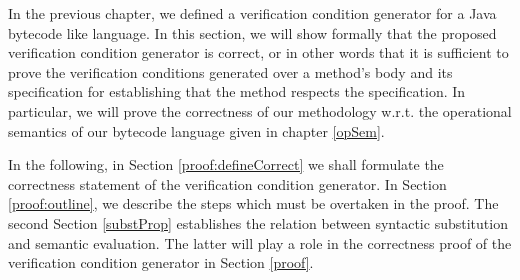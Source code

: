  In the previous chapter, we defined a verification
 condition generator for a Java bytecode like language. In this section, we will show formally that the
 proposed verification condition generator is correct, or in other words that it is sufficient
 to prove the verification conditions generated over a method's body and its specification 
 for establishing that the method respects the specification. 
 In particular, we will prove the correctness of our methodology w.r.t. the operational semantics of our bytecode language
 given in chapter \ref{opSem}.  
 
 

 In the following, in Section \ref{proof:defineCorrect} we shall formulate the correctness statement of the verification 
 condition generator. In Section \ref{proof:outline}, we describe the steps which must be overtaken in the proof. 
 The second Section \ref{substProp} establishes the relation between syntactic substitution  and semantic evaluation.
 The latter will play a role in the correctness proof  of the verification condition generator
 in Section  \ref{proof}.
  



